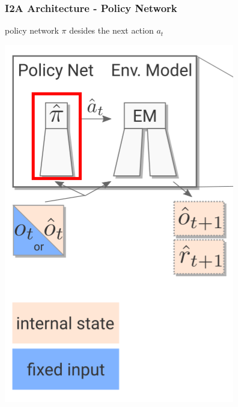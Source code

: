 \begin{frame}
    \frametitle{I2A Architecture - Policy Network}

\begin{multicols}{2}
	\begin{PraesentationAufzaehlung}
	    \item policy network $\pi$
		desides the next action $a_t$
	\end{PraesentationAufzaehlung}
    \vfill\columnbreak
	\begin{center}
    \includegraphics[height=0.5\textheight]{./Images/policy.png}%
	\end{center}
\end{multicols}
    
\end{frame}
\clearpage

